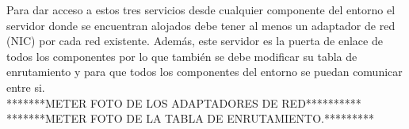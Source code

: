     \fi
    Para dar acceso a estos tres servicios desde cualquier componente del entorno el servidor donde se encuentran alojados debe tener al menos un adaptador de red (NIC) por cada red existente. Además, este servidor es la puerta de enlace de todos los componentes por lo que también se debe modificar su tabla de enrutamiento y para que todos los componentes del entorno se puedan comunicar entre si.\\
    *******METER FOTO DE LOS ADAPTADORES DE RED**********\\
    *******METER FOTO DE LA TABLA DE ENRUTAMIENTO.*********
    
\FloatBarrier